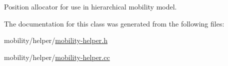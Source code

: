 Position allocator for use in hierarchical mobility model. 



The documentation for this class was generated from the following files\+:\begin{DoxyCompactItemize}
\item 
mobility/helper/\hyperlink{mobility-helper_8h}{mobility-\/helper.\+h}\item 
mobility/helper/\hyperlink{mobility-helper_8cc}{mobility-\/helper.\+cc}\end{DoxyCompactItemize}
